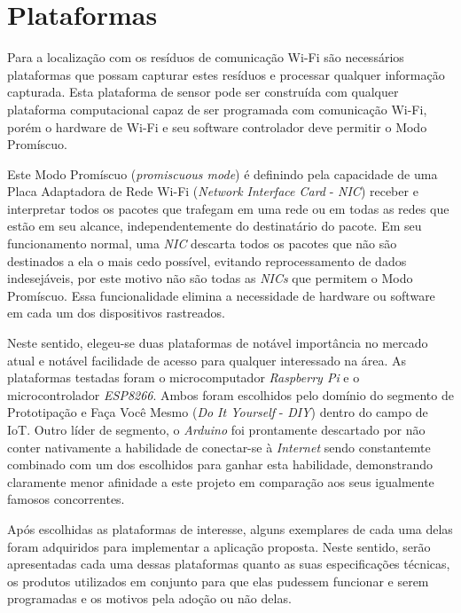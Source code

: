 \chapter{Plataformas}
\label{chap:Plataformas}

Para a localização com os resíduos de comunicação Wi-Fi são necessários
plataformas que possam capturar estes resíduos e processar qualquer informação
capturada. Esta plataforma de sensor pode ser construída com
qualquer plataforma computacional capaz de ser programada com comunicação
Wi-Fi, porém o hardware de Wi-Fi e seu software
controlador deve permitir o Modo Promíscuo.

Este Modo Promíscuo (\emph{promiscuous mode}) é definindo pela capacidade de uma
Placa Adaptadora de Rede Wi-Fi (\emph{Network Interface Card} -
\emph{NIC}) receber e interpretar todos os pacotes que trafegam em uma rede ou
em todas as redes que estão em seu alcance, independentemente do destinatário do
pacote. Em seu funcionamento normal, uma \emph{NIC} descarta todos os pacotes que
não são destinados a ela o mais cedo possível, evitando reprocessamento de
dados indesejáveis, por este motivo não são todas as \emph{NICs} que permitem o
Modo Promíscuo. Essa funcionalidade elimina a necessidade de hardware ou
software em cada um dos dispositivos rastreados.

Neste sentido, elegeu-se duas plataformas de notável importância no mercado atual
e notável facilidade de acesso para qualquer interessado na área. As plataformas
testadas foram o microcomputador \emph{Raspberry Pi} e o microcontrolador
\emph{ESP8266}. Ambos  foram escolhidos pelo domínio do segmento de Prototipação
e Faça Você Mesmo  (\emph{Do It Yourself} - \emph{DIY}) dentro do campo de IoT.
Outro líder de segmento, o \emph{Arduino}  foi prontamente descartado por não
conter nativamente a habilidade de conectar-se à \emph{Internet} sendo
constantemte combinado com um dos escolhidos para ganhar esta habilidade,
demonstrando claramente menor afinidade a este projeto em comparação aos seus
igualmente famosos concorrentes.

Após escolhidas as plataformas de interesse, alguns exemplares de cada uma delas
foram adquiridos para implementar a aplicação proposta. Neste sentido, serão
apresentadas cada uma dessas plataformas quanto as suas especificações técnicas,
os produtos utilizados em conjunto para que elas pudessem funcionar e serem
programadas e os motivos pela adoção ou não delas.
